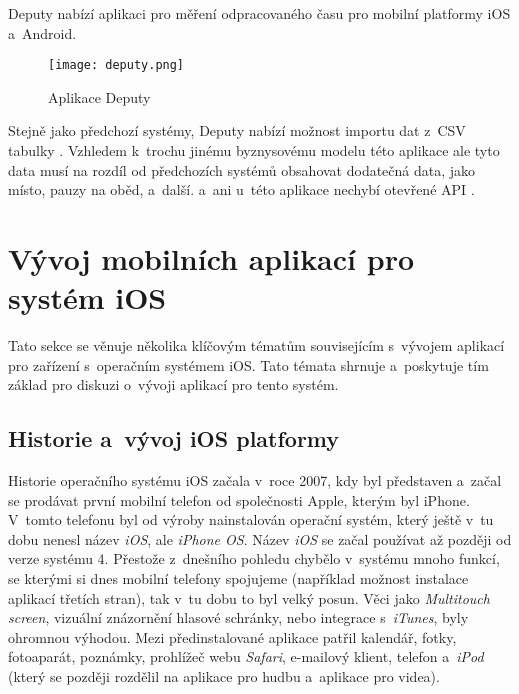 Deputy nabízí aplikaci pro měření odpracovaného času pro mobilní platformy iOS a~Android. 

\begin{figure}[h]
	\centering
	\texttt{[image: deputy.png]}
	\caption{Aplikace Deputy \cite{deputy-time-tracking-app}}
\end{figure}

Stejně jako předchozí systémy, Deputy nabízí možnost importu dat z~CSV tabulky \cite{deputy-import-csv}. Vzhledem k~trochu jinému byznysovému modelu této aplikace ale tyto data musí na rozdíl od předchozích systémů obsahovat dodatečná data, jako místo, pauzy na oběd, a~další. a~ani u~této aplikace nechybí otevřené API \cite{deputy-api}.

\section{Vývoj mobilních aplikací pro systém iOS}

Tato sekce se věnuje několika klíčovým tématům souvisejícím s~vývojem aplikací pro zařízení s~operačním systémem iOS. Tato témata shrnuje a~poskytuje tím základ pro diskuzi o~vývoji aplikací pro tento systém.

\subsection{Historie a~vývoj iOS platformy}

Historie operačního systému iOS začala v~roce 2007, kdy byl představen a~začal se prodávat první mobilní telefon od společnosti Apple, kterým byl iPhone. V~tomto telefonu byl od výroby nainstalován operační systém, který ještě v~tu dobu nenesl název \emph{iOS}, ale \emph{iPhone OS}. Název \emph{iOS} se začal používat až později od verze systému 4. Přestože z~dnešního pohledu chybělo v~systému mnoho funkcí, se kterými si dnes mobilní telefony spojujeme (například možnost instalace aplikací třetích stran), tak v~tu dobu to byl velký posun. Věci jako \emph{Multitouch screen}, vizuální znázornění hlasové schránky, nebo integrace s~\emph{iTunes}, byly ohromnou výhodou. Mezi předinstalované aplikace patřil kalendář, fotky, fotoaparát, poznámky, prohlížeč webu \emph{Safari}, e-mailový klient, telefon a~\emph{iPod} (který se později rozdělil na aplikace pro hudbu a~aplikace pro videa).

